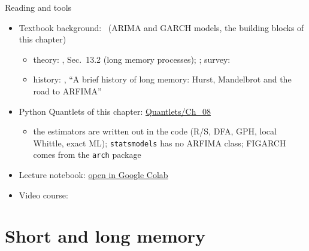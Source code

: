 \begin{frame}{Reading and tools}
\itemsize{\small}
\begin{itemize}
    \item Textbook background: \ (ARIMA and GARCH models, the building blocks of this chapter)
    \begin{itemize}
        \item theory: , Sec.~13.2 (long memory processes); ; survey: 
        \item history: , ``A brief history of long memory: Hurst, Mandelbrot and the road to ARFIMA''
    \end{itemize}
    \item Python Quantlets of this chapter: \href{https://github.com/danpele/Time-Series-Analysis/tree/main/Quantlets/Ch_08}{Quantlets/Ch\_08}
    \begin{itemize}
        \item the estimators are written out in the code (R/S, DFA, GPH, local Whittle, exact ML); \texttt{statsmodels} has no ARFIMA class; FIGARCH comes from the \texttt{arch} package
    \end{itemize}
    \item Lecture notebook: \href{\colaburl{notebooks/EN/chapter8_lecture_notebook.ipynb}}{open in Google Colab}
    \item Video course: 
\end{itemize}
\end{frame}


\section{Short and long memory}

